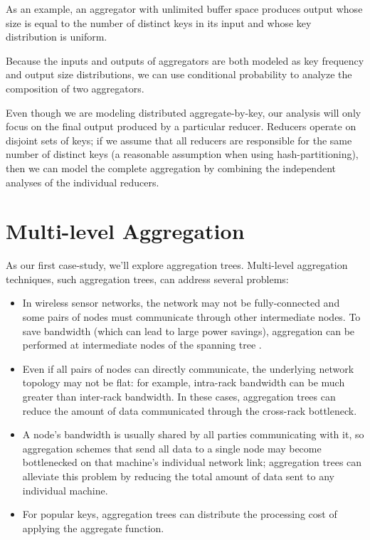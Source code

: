 \documentclass[12pt]{article}
\begin{document}
As an example, an aggregator with unlimited buffer space produces output whose
size is equal to the number of distinct keys in its input and whose key
distribution is uniform.

Because the inputs and outputs of aggregators are both modeled as key
frequency and output size distributions, we can use conditional probability to
analyze the composition of two aggregators.

Even though we are modeling distributed aggregate-by-key, our analysis will
only focus on the final output produced by a particular reducer.  Reducers
operate on disjoint sets of keys; if we assume that all reducers are
responsible for the same number of distinct keys (a reasonable assumption when
using hash-partitioning), then we can model the complete aggregation
by combining the independent analyses of the individual reducers.

\section{Multi-level Aggregation}

As our first case-study, we'll explore aggregation trees.
Multi-level aggregation techniques, such aggregation trees, can address
several problems:

\begin{itemize}
    \item In wireless sensor networks, the network may not be fully-connected
    and some pairs of nodes must communicate through other intermediate nodes.
    To save bandwidth (which can lead to large power savings), aggregation can
    be performed at intermediate nodes of the spanning tree \cite{tag}.

    \item Even if all pairs of nodes can directly communicate, the underlying
    network topology may not be flat: for example, intra-rack bandwidth can be
    much greater than inter-rack bandwidth.  In these cases, aggregation trees
    can reduce the amount of data communicated through the cross-rack
    bottleneck.

    \item A node's bandwidth is usually shared by all parties communicating
    with it, so aggregation schemes that send all data to a single node may
    become bottlenecked on that machine's individual network link; aggregation
    trees can alleviate this problem by reducing the total amount of data sent
    to any individual machine.

    \item For popular keys, aggregation trees can distribute the processing
    cost of applying the aggregate function.

\end{itemize}
\end{document}
